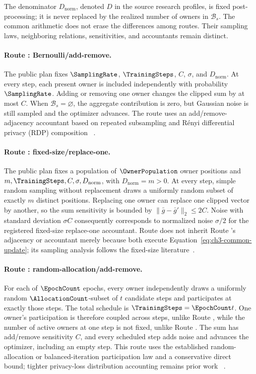 The denominator \(D_{\mathrm{norm}}\), denoted \(D\) in the source research
profiles, is fixed post-processing; it is never replaced by the realized number of
owners in \(\mathcal B_s\).  The common arithmetic does not erase the differences
among routes.  Their sampling laws, neighboring relations, sensitivities, and
accountants remain distinct.

\paragraph{Route \RouteP: Bernoulli/add-remove.}
The public plan fixes \(\SamplingRate\), \(\TrainingSteps\), \(C\), \(\sigma\),
and \(D_{\mathrm{norm}}\).  At every step, each present owner is included
independently with probability \(\SamplingRate\).  Adding or removing one owner
changes the clipped sum by at most \(C\).  When
\(\mathcal B_s=\varnothing\), the aggregate contribution is zero, but Gaussian
noise is still sampled and the optimizer advances.  The route uses an
add/remove-adjacency accountant based on repeated subsampling and R{\'e}nyi
differential privacy (RDP) composition
~\cite{mironov2017renyi,wang2019subsampled,yousefpour2021opacus}.

\paragraph{Route \RouteF: fixed-size/replace-one.}
The public plan fixes a population of \(\OwnerPopulation\) owner positions and
\(m,\TrainingSteps,C,\sigma,D_{\mathrm{norm}}\), with
\(D_{\mathrm{norm}}=m>0\).  At every step, simple random sampling without
replacement draws a uniformly random subset of exactly \(m\) distinct positions.
Replacing one owner can replace one clipped vector by another, so the sum
sensitivity is bounded by
\(\lVert\bar g-\bar g'\rVert_2\leq2C\).  Noise with standard deviation
\(\sigma C\) consequently corresponds to normalized noise \(\sigma/2\) for the
registered fixed-size replace-one accountant.  Route \RouteF{} does not inherit
Route \RouteP's adjacency or accountant merely because both execute
Equation~\eqref{eq:ch3-common-update}; its sampling analysis follows the
fixed-size literature~\cite{wang2019subsampled,birrell2024fixed}.

\paragraph{Route \RouteA: random-allocation/add-remove.}
For each of \(\EpochCount\) epochs, every owner independently draws a uniformly
random \(\AllocationCount\)-subset of \(t\) candidate steps and participates at
exactly those steps.  The total schedule is
\(\TrainingSteps=\EpochCount t\).  One owner's participation is therefore coupled
across steps, unlike Route \RouteP, while the number of active owners at one step
is not fixed, unlike Route \RouteF.  The sum has add/remove sensitivity \(C\), and
every scheduled step adds noise and advances the optimizer, including an empty
step.  This route uses the established random-allocation or balanced-iteration
participation law and a conservative direct bound; tighter privacy-loss
distribution accounting remains prior work
~\cite{shenfeld2025randomallocation,feldman2026pld,dong2026optimal}.

